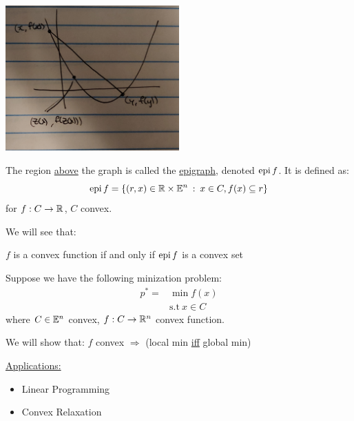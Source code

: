 \begin{example}
    ~\\
    \begin{minipage}{\textwidth}
        \centering
        \includegraphics[width=0.5\textwidth]{images/lec1-convex-function}
    \end{minipage}
\end{example}

The region \underline{above} the graph is called the \underline{epigraph}, denoted $\operatorname{epi} f$.
It is defined as:
\begin{equation*}
    \operatorname{epi} f = \{ (r, x) \in \mathbb{R} \times \mathbb{E}^n\::\:x \in C, f(x) \subseteq r\}
\end{equation*}
for $f: C \rightarrow \mathbb{R}$, $C$ convex.

We will see that:
\begin{theorem}
    $f$ is a convex function if and only if $\operatorname{epi} f$ is a convex set
\end{theorem}

Suppose we have the following minization problem:
\begin{align*}
    p^* = &\min f(x) \\
    &\text{s.t} \ x \in C
\end{align*}
where $C \in \mathbb{E}^n$ convex, $f:C \rightarrow \mathbb{R}^n$ convex function.

We will show that: $f$ convex $\Rightarrow$ (local min \underline{iff} global min)

\underline{Applications:}

\begin{itemize}
    \item Linear Programming
    \item Convex Relaxation
\end{itemize}